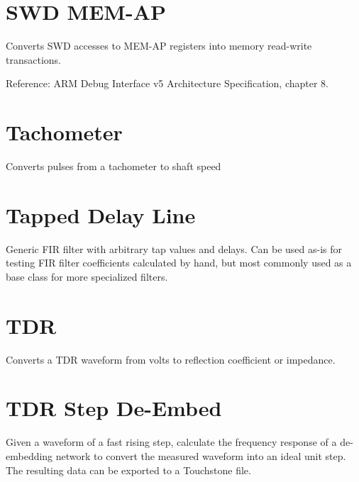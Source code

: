 \pagebreak
\section{SWD MEM-AP}

Converts SWD accesses to MEM-AP registers into memory read-write transactions.

Reference: ARM Debug Interface v5 Architecture Specification, chapter 8.

\pagebreak
\section{Tachometer}

Converts pulses from a tachometer to shaft speed

\pagebreak
\section{Tapped Delay Line}

Generic FIR filter with arbitrary tap values and delays. Can be used as-is for testing FIR filter coefficients
calculated by hand, but most commonly used as a base class for more specialized filters.

\pagebreak
\section{TDR}

Converts a TDR waveform from volts to reflection coefficient or impedance.

\pagebreak
\section{TDR Step De-Embed}

Given a waveform of a fast rising step, calculate the frequency response of a de-embedding network to convert the
measured waveform into an ideal unit step. The resulting data can be exported to a Touchstone file.


